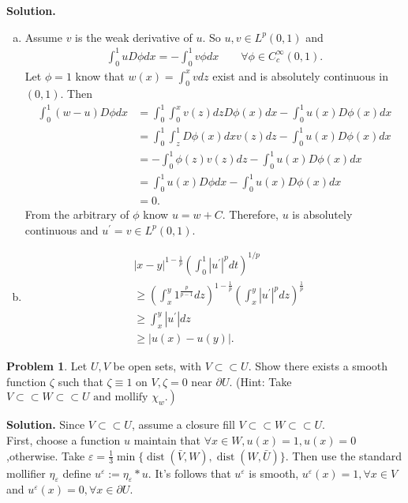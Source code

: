 \documentclass[a4paper]{book}
\newenvironment{solution}%
{\noindent\textbf{Solution.}}%
{\qedhere}
\numberwithin{equation}{chapter}
\theoremstyle{definition}
\newtheorem{pro}[exm]{Problem}
\begin{document}
\begin{solution}
  \begin{enumerate}[(a)]
  \item Assume $v$ is the weak derivative of $u$. So $u,v \in L^p(0,1)$ and 
    \begin{align*}
      \int_0^1 u D\phi dx = - \int_0^1 v \phi dx\qquad \forall \phi \in C^\infty_c(0,1).
    \end{align*}
    Let $\phi = 1$ know that $w(x) = \int_0^x v dz$ exist and is absolutely continuous in$(0,1)$. Then
    \begin{align*}
      \int_0^1 (w - u) D \phi dx
      &= \int_0^1 \int_0^x v(z) dz D \phi(x) dx - \int_0^1 u(x) D \phi(x) dx \\
      &= \int _0^1 \int_z^1 D \phi(x) dx v(z) dz - \int_0^1 u(x) D \phi(x) dx \\
      &= -\int_0^1 \phi(z) v(z) dz - \int_0^1  u(x) D\phi(x) dx   \\
      &= \int_0^1 u(x) D \phi dx - \int_0^1    u(x) D\phi(x) dx  \\
      &=0.
    \end{align*}
    From the arbitrary of $\phi$ know $u = w + C$. Therefore, $u$ is absolutely continuous and $u^\prime = v \in L^p(0,1)$.

  \item
    \begin{align*}
      &|x-y|^{1-\frac{1}{p}}\left(\int_{0}^{1}\left|u^{\prime}\right|^{p} d t\right)^{1 / p} \\
      & \geq \left(\int_x^y 1^{\frac{p}{p-1}} dz\right)^{1 - \frac{1}{p}} \left(\int_x^y \left| u^\prime \right|^p dz\right)^{\frac{1}{p}} \\
      & \geq \int_x^y \left| u^\prime \right| dz \\
      & \geq \left| u(x) - u(y) \right|.
    \end{align*}
  \end{enumerate}
\end{solution}


\begin{pro}\label{pro5}
  Let $U, V$ be open sets, with $V \subset \subset U .$ Show there exists a smooth function $\zeta$ such that $\zeta \equiv 1$ on $V, \zeta=0$ near $\partial U .$ (Hint: Take $\left.V \subset \subset W \subset \subset U \text { and mollify } \chi_{w} .\right)$
\end{pro}

\begin{solution}
  Since $V \subset \subset U$, assume a closure fill $V \subset \subset W \subset \subset U$.\\
  First, choose a function $u$ maintain that $\forall x \in W, u(x) = 1, u(x) = 0$,otherwise. Take $\varepsilon = \frac{1}{3} \min\{\operatorname{dist}(\bar{V}, W), \operatorname{dist}(W, \bar{U})\}$. Then use the standard mollifier $\eta_\varepsilon$ define $u^\varepsilon :=  \eta_\varepsilon * u$. It's follows that $u^\varepsilon$ is smooth, $u^\varepsilon(x) = 1, \forall x \in V$ and $u^\varepsilon(x) = 0, \forall x \in \partial U$.
\end{solution}
\end{document}
